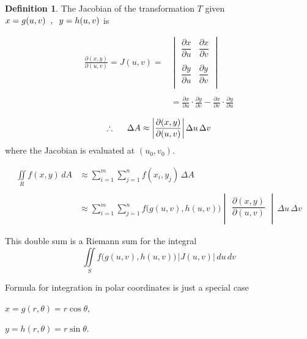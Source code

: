 \documentclass[11pt,a4paper]{article}
\theoremstyle{definition}
\newtheorem{defn}[thm]{Definition}
\begin{document}
\begin{defn}


The Jacobian of the transformation $T$ given $x = g(u,v)\hspace{0.2cm} , \hspace{0.2cm} y = h(u,v)$ is 

\begin{align*}
\frac{\partial (x,y)}{\partial (u,v)} = J(u,v) = &
 \begin{vmatrix}
\dfrac{\partial x}{\partial u} & \dfrac{\partial x}{\partial v}\\\\
\dfrac{\partial y}{\partial u} & \dfrac{\partial y}{\partial v}\\
\end{vmatrix}\\\\
& = \frac{\partial x}{\partial u}\cdot \frac{\partial y}{\partial v} - \frac{\partial x}{\partial v}\cdot \frac{\partial y}{\partial u}
\end{align*}

$$\therefore \hspace{0.5cm} \Delta A \approx \begin{vmatrix}
\dfrac{\partial ( x,y)}{\partial (u,v)}\\
\end{vmatrix} \Delta u\, \Delta v$$  where the Jacobian is evaluated at $(u_0,v_0)$.

\begin{align*}
\iint\limits_R f(x,y)\, dA & \approx \sum^m_{i=1}\sum^n_{j = 1} f(x_i , y_j)\, \Delta A\\\\
& \approx \sum^m_{i=1}\sum^n_{j = 1}f\big(g(u,v), h(u,v)\big)\begin{vmatrix}
\dfrac{\partial ( x,y)}{\partial (u,v)}\\
\end{vmatrix}\, \Delta u \,\Delta v 
\end{align*}

This double sum is a Riemann sum for the integral $$\iint\limits_S f\big(g(u,v),h(u,v)\big)\, \Big|J(u,v)\Big|\, du\, dv $$


Formula for integration in polar coordinates is just a special case


$x = g(r,\theta) = r \cos \theta , $


$ y = h(r,\theta ) = r\sin \theta$.


\end{defn}
\end{document}
